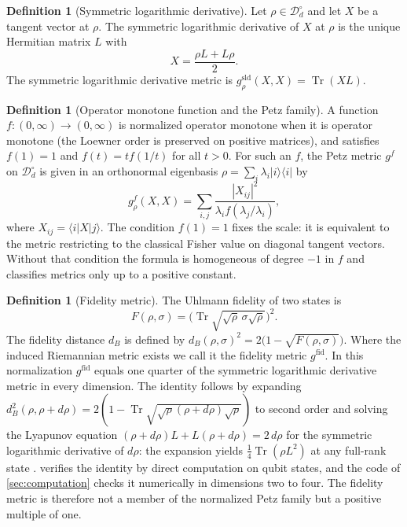 \documentclass[11pt,letterpaper]{article}
\theoremstyle{definition}
\newtheorem{definition}[theorem]{Definition}
\theoremstyle{remark}
\begin{document}
\begin{definition}[Symmetric logarithmic derivative]
\label{def:sld}
Let $\rho \in \mathcal{D}_d^{\circ}$ and let $X$ be a tangent vector at $\rho$. The symmetric logarithmic derivative of $X$ at $\rho$ is the unique Hermitian matrix $L$ with
\begin{equation}
X = \frac{\rho L + L \rho}{2}.
\end{equation}
The symmetric logarithmic derivative metric is $g^{\mathrm{sld}}_{\rho}(X, X) = \operatorname{Tr}(X L)$.
\end{definition}

\begin{definition}[Operator monotone function and the Petz family]
\label{def:petz}
A function $f : (0, \infty) \to (0, \infty)$ is normalized operator monotone when it is operator monotone (the Loewner order is preserved on positive matrices), and satisfies $f(1) = 1$ and $f(t) = t f(1/t)$ for all $t > 0$. For such an $f$, the Petz metric \cite{petz-1996} $g^{f}$ on $\mathcal{D}_d^{\circ}$ is given in an orthonormal eigenbasis $\rho = \sum_i \lambda_i |i\rangle\langle i|$ by
\begin{equation}
\label{eq:petz}
g^{f}_{\rho}(X, X) = \sum_{i,j} \frac{|X_{ij}|^2}{\lambda_i f(\lambda_j / \lambda_i)},
\end{equation}
where $X_{ij} = \langle i | X | j \rangle$. The condition $f(1) = 1$ fixes the scale: it is equivalent to the metric restricting to the classical Fisher value on diagonal tangent vectors. Without that condition the formula is homogeneous of degree $-1$ in $f$ and classifies metrics only up to a positive constant.
\end{definition}

\begin{definition}[Fidelity metric]
\label{def:fidelity}
The Uhlmann fidelity \cite{uhlmann} of two states is
\begin{equation}
F(\rho, \sigma) = \bigl(\operatorname{Tr}\sqrt{\sqrt{\rho}\, \sigma \sqrt{\rho}}\bigr)^2.
\end{equation}
The fidelity distance $d_B$ is defined by $d_B(\rho, \sigma)^2 = 2\bigl(1 - \sqrt{F(\rho, \sigma)}\bigr)$. Where the induced Riemannian metric exists we call it the fidelity metric $g^{\mathrm{fid}}$. In this normalization $g^{\mathrm{fid}}$ equals one quarter of the symmetric logarithmic derivative metric in every dimension. The identity follows by expanding $d_B^2(\rho, \rho + d\rho) = 2(1 - \operatorname{Tr}\sqrt{\sqrt{\rho}(\rho + d\rho)\sqrt{\rho}})$ to second order and solving the Lyapunov equation $(\rho + d\rho) L + L (\rho + d\rho) = 2 \, d\rho$ for the symmetric logarithmic derivative of $d\rho$: the expansion yields $\tfrac{1}{4} \operatorname{Tr}(\rho L^2)$ at any full-rank state \cite{hubner, braunstein-caves}.  verifies the identity by direct computation on qubit states, and the code of \cref{sec:computation} checks it numerically in dimensions two to four. The fidelity metric is therefore not a member of the normalized Petz family but a positive multiple of one.
\end{definition}
\end{document}

